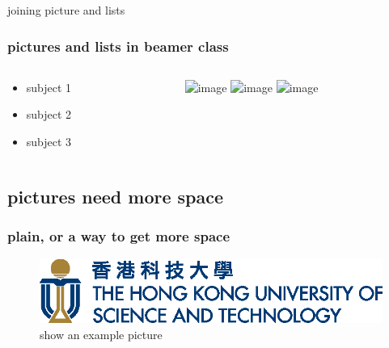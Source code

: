 \documentclass{beamer}
\begin{document}
\begin{frame}{joining picture and lists} 
	\frametitle{pictures and lists in beamer class}
	\begin{columns}
		\begin{column}{5cm}
			\begin{itemize}
				\item<1-> subject 1
				\item<3-> subject 2
				\item<5-> subject 3
			\end{itemize}
			\vspace{3cm} 
		\end{column}
		\begin{column}{5cm}
			\begin{overprint}
				\includegraphics<2>[width=5cm]{fig/mismatch-overtime}
				\includegraphics<4>[width=5cm]{fig/server_cv_cdf}
				\includegraphics<6>[width=5cm]{fig/sy-req-vs-seg}
			\end{overprint}
		\end{column}
	\end{columns}
\end{frame}

\subsection{pictures need more space} 
\begin{frame}[plain]
	\frametitle{plain, or a way to get more space}
	\begin{figure}
		\includegraphics[scale=1.0]{UST4C_L3} 
		\caption{show an example picture}
	\end{figure}
\end{frame}

%
\end{document}
